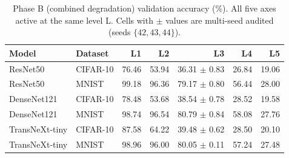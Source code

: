 \begin{table}[htbp]
\centering
\caption{Phase B (combined degradation) validation accuracy (\%). All five axes active at the same level L. Cells with $\pm$ values are multi-seed audited (seeds $\{42, 43, 44\}$).}
\label{tab:phase_b}
\setlength{\tabcolsep}{4pt}
\renewcommand{\arraystretch}{1.1}
\begin{tabular}{llrrrrr}
\toprule
Model & Dataset & L1 & L2 & L3 & L4 & L5 \\
\midrule
ResNet50 & CIFAR-10 & 76.46 & 53.94 & 36.31 $\pm$ 0.83 & 26.84 & 19.06 \\
ResNet50 & MNIST & 99.18 & 96.36 & 79.17 $\pm$ 0.80 & 56.44 & 28.00 \\
DenseNet121 & CIFAR-10 & 78.48 & 53.68 & 38.54 $\pm$ 0.78 & 28.52 & 19.58 \\
DenseNet121 & MNIST & 98.74 & 96.54 & 80.79 $\pm$ 0.84 & 58.08 & 27.76 \\
TransNeXt-tiny & CIFAR-10 & 87.58 & 64.22 & 39.48 $\pm$ 0.62 & 28.50 & 20.10 \\
TransNeXt-tiny & MNIST & 98.96 & 96.00 & 80.05 $\pm$ 0.11 & 57.24 & 27.48 \\
\bottomrule
\end{tabular}
\end{table}
